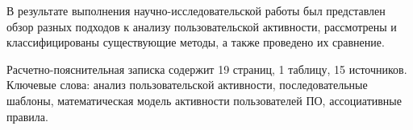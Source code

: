 
В результате выполнения научно-исследовательской работы был представлен обзор разных подходов к анализу пользовательской активности, рассмотрены и классифицированы существующие методы, а также проведено их сравнение.

Расчетно-пояснительная записка содержит 19 страниц, 1 таблицу, 15 источников. Ключевые слова: анализ пользовательской активности, последовательные шаблоны, математическая модель активности пользователей ПО, ассоциативные правила.

%
%
%

%

